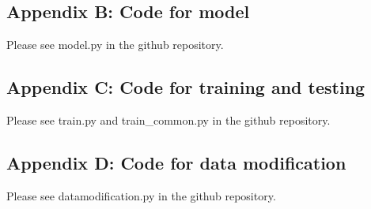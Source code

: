 \documentclass[10pt,twocolumn,letterpaper]{article}
\begin{document}
\subsection{Appendix B: Code for model}
Please see model.py in the github repository. 

\subsection{Appendix C: Code for training and testing}
Please see train.py and train\_common.py in the github repository.

\subsection{Appendix D: Code for data modification}
Please see datamodification.py in the github repository.


\end{document}

